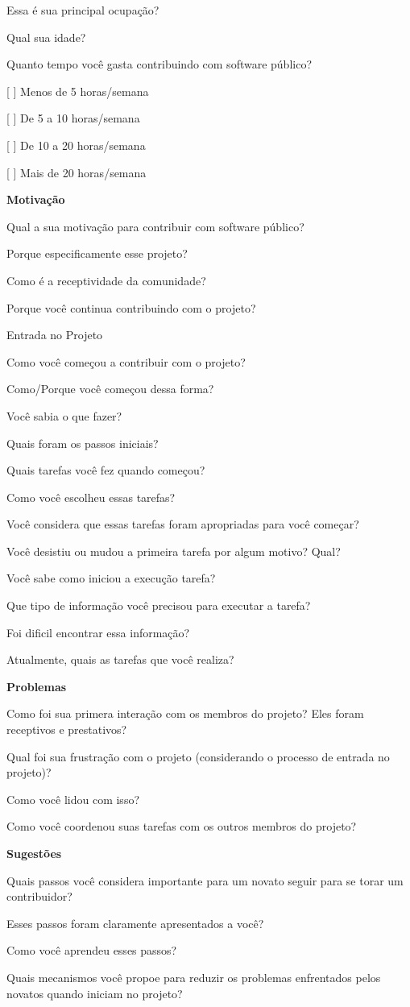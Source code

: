 \begin{anexosenv}
Essa é sua principal ocupação?

Qual sua idade?

Quanto tempo você gasta contribuindo com software público?

[ ] Menos de 5 horas/semana 

[ ] De 5 a 10 horas/semana

[ ] De 10 a 20 horas/semana

[ ] Mais de 20 horas/semana


\textbf{Motivação}

Qual a sua motivação para contribuir com software público?

Porque especificamente esse projeto?

Como é a receptividade da comunidade?

Porque você continua contribuindo com o projeto?

Entrada no Projeto

Como você começou a contribuir com o projeto?

Como/Porque você começou dessa forma?

Você sabia o que fazer?

Quais foram os passos iniciais?

Quais tarefas você fez quando começou?

Como você escolheu essas tarefas?

Você considera que essas tarefas foram apropriadas para você começar? 

Você desistiu ou mudou a primeira tarefa por algum motivo? Qual?

Você sabe como iniciou a execução tarefa?

Que tipo de informação você precisou para executar a tarefa?

Foi dificil encontrar essa informação?

Atualmente, quais as tarefas que você realiza?


\textbf{Problemas}

Como foi sua primera interação com os membros do projeto? Eles foram receptivos e prestativos?

Qual foi sua frustração com o projeto (considerando o processo de entrada no projeto)?

Como você lidou com isso?

Como você coordenou suas tarefas com os outros membros do projeto?


\textbf{Sugestões}

Quais passos você considera importante para um novato seguir para se torar um contribuidor?

Esses passos foram claramente apresentados a você?

Como você aprendeu esses passos?

Quais mecanismos você propoe para reduzir os problemas enfrentados pelos novatos quando iniciam no projeto?




\end{anexosenv}

